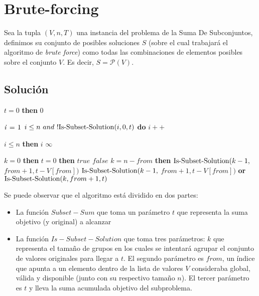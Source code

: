 \section{Brute-forcing}
Sea la tupla $(V, n, T)$ una instancia del problema de la Suma De Subconjuntos, definimos su conjunto de posibles soluciones $S$ (sobre el cual trabajará el algoritmo de \textit{brute force}) como todas las combinaciones de elementos posibles sobre el conjunto $V$. Es decir, $S = \mathcal{P}(V)$.

\subsection{Solución}
\begin{center}
	\begin{minipage}[t]{.49\textwidth}
		\raggedright
		\begin{codebox}
				\li \If $t = 0$ \textbf{then} \Return $0$
				\zi

				\li $\id{i} \gets 1$
				\li \While $i \leq n \ and \ !\func{Is-Subset-Solution}(i, 0, t)$ \textbf{do}
				\Do
					\li $i++$
					\zi
				\End

				\li \If $i \leq n$ \textbf{then}
				\li \Then
					\Return $i$
					\li
				\Else
					\li \Return $\infty$
				\End
			\End
		\end{codebox}
	\end{minipage}%
	\begin{minipage}[t]{.5\textwidth}
		\raggedleft
		\begin{codebox}
			\Procname{$\proc{Is-Subset-Solution}(k, \ from, \ t)$}
				\li \If $k = 0$ \textbf{then}
				\Then
					\li \If $t = 0$ \textbf{then}
					\li \Then
						\Return $true$
					\li \Else
						\li \Return $false$
					\End
				\li \Else
					\li \If $k = n - from$ \textbf{then}
					\li \Then
						\Return $\func{Is-Subset-Solution}(k - 1,$
						\zi $from + 1, t - V[from])$
					\li \Else
						\li \Return $\func{Is-Subset-Solution}(k - 1,$
						\zi $from + 1, t - V[from])$ \textbf{or}
						\zi $\func{Is-Subset-Solution}(k, from + 1, t)$
					\End
				\End
			\End
		\end{codebox}
		\label{fig:alg-bruteforce}
	\end{minipage}
\end{center}
Se puede observar que el algoritmo está dividido en dos partes:
\begin{itemize}
	\item La función $Subset-Sum$ que toma un parámetro $t$ que representa la suma objetivo (y original) a alcanzar
	\item La función $Is-Subset-Solution$ que toma tres parámetros: $k$ que representa el tamaño de grupos en los cuales se intentará agrupar el conjunto de valores originales para llegar a $t$. El segundo parámetro es $from$, un índice que apunta a un elemento dentro de la lista de valores $V$ consideraba global, válida y disponible (junto con su respectivo tamaño $n$). El tercer parámetro es $t$ y lleva la suma acumulada objetivo del subproblema.
\end{itemize}


